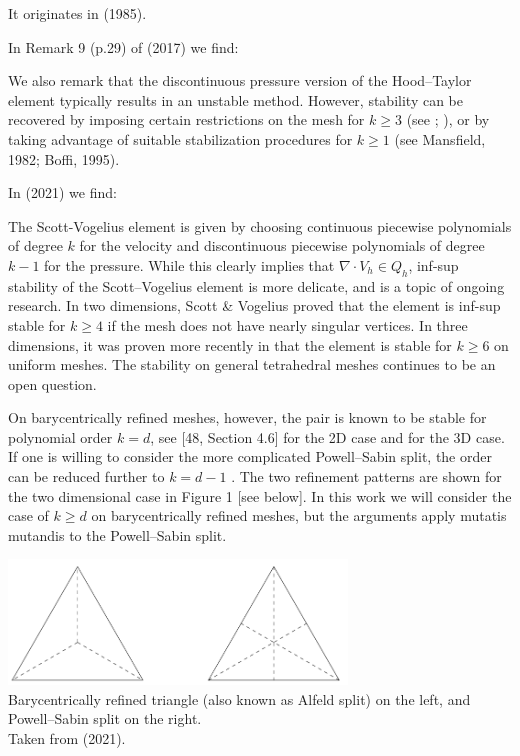 
It originates in  (1985). 

 
In Remark 9 (p.29) of \textcite{aubb17} (2017) we find: 
\begin{displayquote}
{\color{darkgray}
We also remark that the discontinuous
pressure version of the Hood–Taylor element typically
results in an unstable method. However, stability can be
recovered by imposing certain restrictions on the mesh for
$k \ge 3$ (see \cite{voge83}; \cite{scvo85}), or
by taking advantage of suitable stabilization procedures for
$k\ge 1$ (see Mansfield, 1982; Boffi, 1995).
}
\end{displayquote}

In \textcite{fams21} (2021) we find:
\begin{displayquote}
{\color{darkgray}
The Scott-Vogelius element is given by choosing continuous piecewise 
polynomials of degree $k$ for the velocity and discontinuous piecewise 
polynomials of degree $k-1$ for the pressure. While this clearly
implies that $\nabla\cdot V_h \in Q_h$, inf-sup stability of the 
Scott–Vogelius element is more delicate, and is a topic of ongoing research. 
In two dimensions, Scott \& Vogelius proved \cite{scvo85} that the element is inf-sup
stable for $k\ge 4$ if the mesh does not have nearly singular vertices. 
In three dimensions, it was proven more recently in \cite{zhan11b} 
that the element is stable for $k\ge 6$ on uniform meshes. The stability on general
tetrahedral meshes continues to be an open question.

On barycentrically refined meshes, however, the pair is known to 
be stable for polynomial order
$k = d$, see [48, Section 4.6] for the 2D case and 
\cite{zhan05} for the 3D case. If one is willing to 
consider the more complicated Powell–Sabin split, the order 
can be reduced further to $k=d-1$ \cite{zhan08,zhan11a}. The two
refinement patterns are shown for the two dimensional case 
in Figure 1 [see below]. In this work we will consider
the case of $k \ge d$ on barycentrically refined meshes, but 
the arguments apply mutatis mutandis to the Powell–Sabin split.
}
\end{displayquote}

\begin{center}
\includegraphics[width=9cm]{images/pair_scott_vogelius/scottvogelius_split}\\
{\captionfont 
Barycentrically refined triangle (also known as Alfeld split) on the left,
and Powell–Sabin split on the right.\\ Taken from \textcite{fams21} (2021).}
\end{center}

